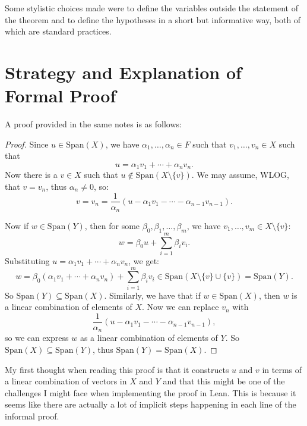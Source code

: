 \documentclass{article}
\begin{document}
Some stylistic choices made were to define the variables outside the statement of the theorem and to define the hypotheses in a short but informative way, both of which are standard practices.

\section{Strategy and Explanation of Formal Proof}

A proof provided in the same notes is as follows:
\vspace{0.5cm}
\begin{adjustwidth}{1cm}{1cm}
\begin{proof}
    Since $u \in \text{Span}(X)$, we have $\alpha_1, \ldots, \alpha_n \in F$ such that $v_1, \ldots, v_n \in X$ such that 
    \[
    u = \alpha_1 v_1 + \cdots + \alpha_n v_n.
    \]
    Now there is a $v \in X$ such that $u \not\in \text{Span}(X \setminus \{v\})$. We may assume, WLOG, that $v = v_n$, thus $\alpha_n \neq 0$, so:
    \[
    v = v_n = \frac{1}{\alpha_n} \left(u - \alpha_1 v_1 - \cdots - \alpha_{n-1} v_{n-1}\right).
    \]

    Now if $w \in \text{Span}(Y)$, then for some $\beta_0, \beta_1, \ldots, \beta_m$, we have $v_1, \ldots, v_m \in X \setminus \{v\}$:
    \[
    w = \beta_0 u + \sum_{i=1}^m \beta_i v_i.
    \]
    Substituting $u = \alpha_1 v_1 + \cdots + \alpha_n v_n$, we get:
    \[
    w = \beta_0 (\alpha_1 v_1 + \cdots + \alpha_n v_n) + \sum_{i=1}^m \beta_i v_i \in \text{Span}(X \setminus \{v\} \cup \{v\}) = \text{Span}(Y).
    \]
    So $\text{Span}(Y) \subseteq \text{Span}(X)$. Similarly, we have that if $w \in \text{Span}(X)$, then $w$ is a linear combination of elements of $X$. Now we can replace $v_n$ with 
    \[
    \frac{1}{\alpha_n} \left(u - \alpha_1 v_1 - \cdots - \alpha_{n-1} v_{n-1}\right),
    \]
    so we can express $w$ as a linear combination of elements of $Y$. So $\text{Span}(X) \subseteq \text{Span}(Y)$, thus $\text{Span}(Y) = \text{Span}(X)$.
\end{proof}
\end{adjustwidth}
\vspace{0.5cm}

My first thought when reading this proof is that it constructs \(u\) and \(v\) in terms of a linear combination of vectors in \(X\) and \(Y\) and that this might be  one of the challenges I might face when implementing the proof in Lean. This is because it seems like there are actually a lot of implicit steps happening in each line of the informal proof.
\end{document}
